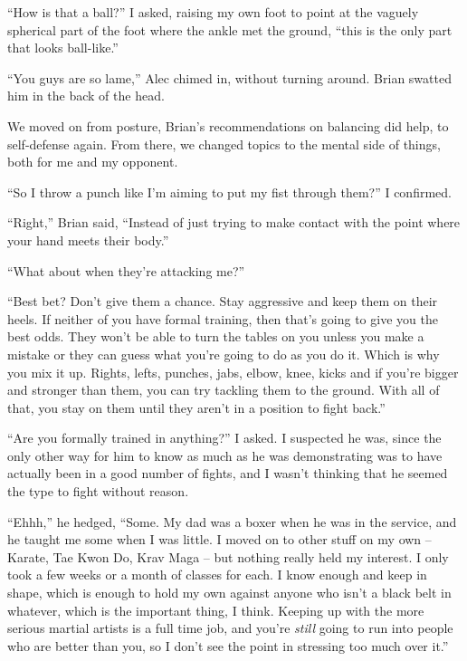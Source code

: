 ``How is that a ball?'' I asked, raising my own foot to point at the vaguely spherical part of the foot where the ankle met the ground, ``this is the only part that looks ball-like.''



``You guys are so lame,'' Alec chimed in, without turning around.  Brian swatted him in the back of the head.



We moved on from posture, Brian's recommendations on balancing did help,  to self-defense again.  From there, we changed topics to the mental side of things, both for me and my opponent.



``So I throw a punch like I'm aiming to put my fist through them?'' I confirmed.



``Right,'' Brian said, ``Instead of just trying to make contact with the point where your hand meets their body.''



``What about when they're attacking me?''



``Best bet?  Don't give them a chance.  Stay aggressive and keep them on their heels.  If neither of you have formal training, then that's going to give you the best odds.  They won't be able to turn the tables on you unless you make a mistake or they can guess what you're going to do as you do it.  Which is why you mix it up.  Rights, lefts, punches, jabs, elbow, knee, kicks and if you're bigger and stronger than them, you can try tackling them to the ground.  With all of that, you stay on them until they aren't in a position to fight back.''



``Are you formally trained in anything?'' I asked.  I suspected he was, since the only other way for him to know as much as he was demonstrating was to have actually been in a good number of fights, and I wasn't thinking that he seemed the type to fight without reason.



``Ehhh,'' he hedged, ``Some.  My dad was a boxer when he was in the service, and he taught me some when I was little.  I moved on to other stuff on my own – Karate, Tae Kwon Do, Krav Maga – but nothing really held my interest.  I only took a few weeks or a month of classes for each.  I know enough and keep in shape, which is enough to hold my own against anyone who isn't a black belt in whatever, which is the important thing, I think.  Keeping up with the more serious martial artists is a full time job, and you're \emph{still} going to run into people who are better than you, so I don't see the point in stressing too much over it.''



